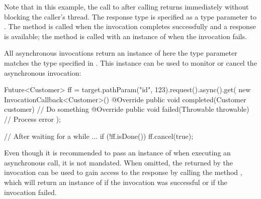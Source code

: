 Note that in this example, the call to  after calling  returns immediately without blocking the caller's thread.
The response type is specified as a type parameter to . The method  is called when the invocation completes successfully and a response is available; the method  is called with an instance of  when the invocation fails.

All asynchronous invocations return an instance of  here the type parameter  matches the type specified in . This instance can be used to monitor or cancel the asynchronous invocation:

\begin{listing}{1}
Future<Customer> ff = target.pathParam("id", 123).request().async().get(
    new InvocationCallback<Customer>() {
        @Override
        public void completed(Customer customer) {
            // Do something
        }
        @Override
        public void failed(Throwable throwable) {
            // Process error
        }
    });

// After waiting for a while ...
if (!ff.isDone()) {
    ff.cancel(true);
} 
\end{listing}

Even though it is recommended to pass an instance of  when executing an asynchronous call, it is not mandated. When omitted, the  returned by the invocation can be used to gain access to the response by calling the method , which will return an instance of  if the invocation was successful or  if the invocation failed.






